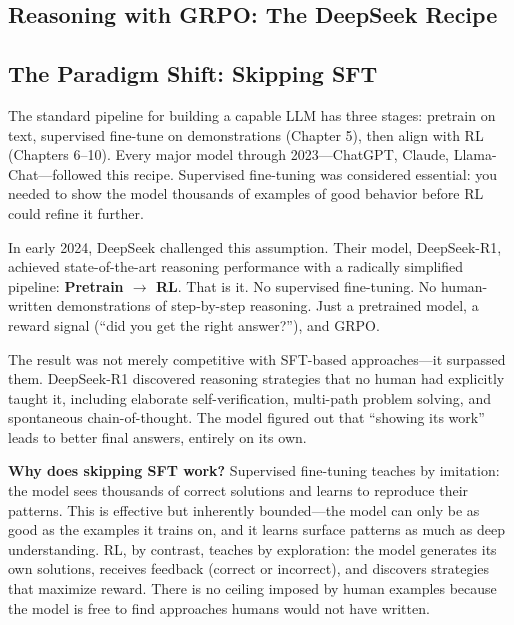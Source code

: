 \begin{chapterenv}

\chapter{Reasoning with GRPO: The DeepSeek Recipe}

\section{The Paradigm Shift: Skipping SFT}

The standard pipeline for building a capable LLM has three stages: pretrain on text, supervised fine-tune on demonstrations (Chapter 5), then align with RL (Chapters 6--10). Every major model through 2023---ChatGPT, Claude, Llama-Chat---followed this recipe. Supervised fine-tuning was considered essential: you needed to show the model thousands of examples of good behavior before RL could refine it further.

In early 2024, DeepSeek challenged this assumption. Their model, DeepSeek-R1, achieved state-of-the-art reasoning performance with a radically simplified pipeline: \textbf{Pretrain $\to$ RL}. That is it. No supervised fine-tuning. No human-written demonstrations of step-by-step reasoning. Just a pretrained model, a reward signal (``did you get the right answer?''), and GRPO.

\begin{tipbox}
The result was not merely competitive with SFT-based approaches---it surpassed them. DeepSeek-R1 discovered reasoning strategies that no human had explicitly taught it, including elaborate self-verification, multi-path problem solving, and spontaneous chain-of-thought. The model figured out that ``showing its work'' leads to better final answers, entirely on its own.
\end{tipbox}

\textbf{Why does skipping SFT work?} Supervised fine-tuning teaches by imitation: the model sees thousands of correct solutions and learns to reproduce their patterns. This is effective but inherently bounded---the model can only be as good as the examples it trains on, and it learns surface patterns as much as deep understanding. RL, by contrast, teaches by exploration: the model generates its own solutions, receives feedback (correct or incorrect), and discovers strategies that maximize reward. There is no ceiling imposed by human examples because the model is free to find approaches humans would not have written.


\end{chapterenv}
